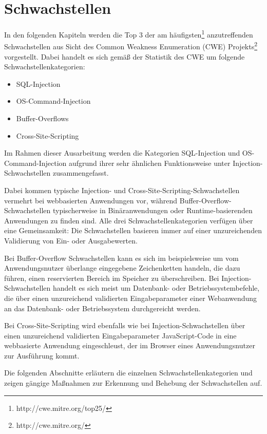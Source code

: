 \section{Schwachstellen}\label{schwachstellen}

In den folgenden Kapiteln werden die Top 3 der am häufigsten\footnote{http://cwe.mitre.org/top25/} anzutreffenden Schwachstellen aus Sicht des Common Weakness Enumeration (CWE) Projekts\footnote{http://cwe.mitre.org/} vorgestellt. Dabei handelt es sich gemäß der Statistik des CWE um folgende Schwachstellenkategorien:

\begin{itemize}
      \item SQL-Injection
      \item OS-Command-Injection
      \item Buffer-Overflows
      \item Cross-Site-Scripting
\end{itemize}

Im Rahmen dieser Ausarbeitung werden die Kategorien SQL-Injection und OS-Command-Injection aufgrund ihrer sehr ähnlichen Funktionsweise unter Injection-Schwachstellen zusammengefasst.

Dabei kommen typische Injection- und Cross-Site-Scripting-Schwachstellen vermehrt bei webbasierten Anwendungen vor, während Buffer-Overflow-Schwachstellen typischerweise in Binäranwendungen oder Runtime-basierenden Anwendungen zu finden sind.
Alle drei Schwachstellenkategorien verfügen über eine Gemeinsamkeit: Die Schwachstellen basieren immer auf einer unzureichenden Validierung von  Ein- oder Ausgabewerten. 

Bei Buffer-Overflow Schwachstellen kann es sich im beispielsweise um vom Anwendungsnutzer überlange eingegebene Zeichenketten handeln, die dazu führen, einen reservierten Bereich im Speicher zu überschreiben. Bei Injection-Schwachstellen handelt es sich meist um Datenbank- oder Betriebssystembefehle, die über einen unzureichend validierten Eingabeparameter einer Webanwendung an das Datenbank- oder Betriebssystem durchgereicht werden.
 
Bei Cross-Site-Scripting wird ebenfalls wie bei Injection-Schwachstellen über einen unzureichend validierten Eingabeparameter JavaScript-Code in eine webbasierte Anwendung eingeschleust, der im Browser eines Anwendungsnutzer zur Ausführung kommt.

Die folgenden Abschnitte erläutern die einzelnen Schwachstellenkategorien und zeigen gängige Maßnahmen zur Erkennung und Behebung der Schwachstellen auf.


